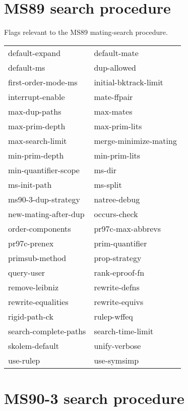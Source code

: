 \section{MS89 search procedure}

\begin{description} 
\item[MS89]  
Flags relevant to the MS89 mating-search procedure.

\begin{tabular}{l l}
default-expand&default-mate\\
default-ms&dup-allowed\\
first-order-mode-ms&initial-bktrack-limit\\
interrupt-enable&mate-ffpair\\
max-dup-paths&max-mates\\
max-prim-depth&max-prim-lits\\
max-search-limit&merge-minimize-mating\\
min-prim-depth&min-prim-lits\\
min-quantifier-scope&ms-dir\\
ms-init-path&ms-split\\
ms90-3-dup-strategy&natree-debug\\
new-mating-after-dup&occurs-check\\
order-components&pr97c-max-abbrevs\\
pr97c-prenex&prim-quantifier\\
primsub-method&prop-strategy\\
query-user&rank-eproof-fn\\
remove-leibniz&rewrite-defns\\
rewrite-equalities&rewrite-equivs\\
rigid-path-ck&rulep-wffeq\\
search-complete-paths&search-time-limit\\
skolem-default&unify-verbose\\
use-rulep&use-symsimp\\
\end{tabular}
\item
\end{description}

\section{MS90-3 search procedure}

